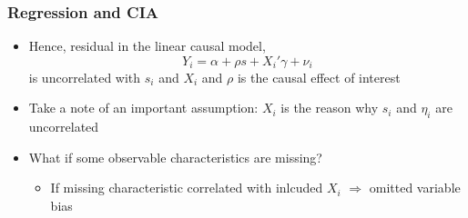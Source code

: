 \documentclass{beamer}
\theoremstyle{plain}
\begin{document}
\begin{frame}
\frametitle{Regression and CIA}
\begin{itemize}
	\item Hence, residual in the linear causal model,
	 	$$ Y_i = \alpha + \rho s + X_i'\gamma + \nu_i $$
	 is uncorrelated with $s_i$ and $X_i$ and $\rho$ is the causal effect of interest
	 \item Take a note of an important assumption: $X_i$ is the reason why $s_i$ and $\eta_i$ are uncorrelated
	 \item What if some observable characteristics are missing?
	 	\begin{itemize}
	 		\item If missing characteristic correlated with inlcuded $X_i$ $\Rightarrow$ omitted variable bias
	 	\end{itemize}
\end{itemize}
\end{frame}
\end{document}
